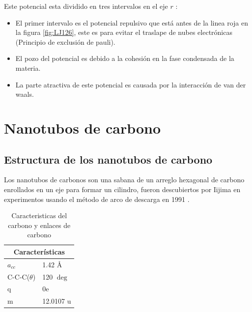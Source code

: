 Este potencial esta dividido en tres intervalos en el eje $r$ \cite{ADAMS2001763}:

\begin{itemize}
    \item El primer intervalo es el potencial repulsivo que está antes de la linea roja en la figura \ref{fig:LJ126}, este es para evitar el traslape de nubes electrónicas (Principio de exclusión de pauli).
    \item El pozo del potencial es debido a la cohesión en la fase condensada de la materia.
    \item La parte atractiva de este potencial es causada por la interacción de van der waals.
\end{itemize}

\begingroup
\let\clearpage\relax
\chapter{Nanotubos de carbono}
\endgroup

\section{Estructura de los nanotubos de carbono}

Los nanotubos de carbonos son una sabana de un arreglo hexagonal de carbono enrollados en un eje para formar un cilindro, fueron descubiertos por Iijima en experimentos usando el método de arco de descarga en 1991 \cite{Iijima1991}.\\

\begin{table}[h!]
    \centering
    \begin{tabular}{ |p{2cm}|p{3cm}|  }
    \hline
    \multicolumn{2}{|c|}{Características} \\
    \hline
    $a_{cc}$   & 1.42 \AA \\
    \hline
    C-C-C($\theta$)   & 120 $\deg$ \\
    \hline
    q & 0e \\
    \hline
    m   & 12.0107 u \\
    \hline
    \end{tabular}
    \caption{Caracteristicas del carbono y enlaces de carbono \cite{Melendez2016}}
    \label{carbono}
\end{table}



